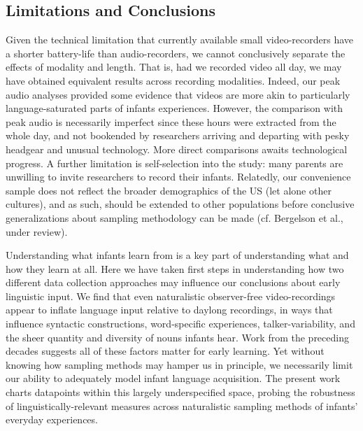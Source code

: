 \documentclass[man]{apa6}
\theoremstyle{definition}
\theoremstyle{definition}
\theoremstyle{definition}
\theoremstyle{remark}
\begin{document}
\subsection{Limitations and
Conclusions}\label{limitations-and-conclusions}

Given the technical limitation that currently available small
video-recorders have a shorter battery-life than audio-recorders, we
cannot conclusively separate the effects of modality and length. That
is, had we recorded video all day, we may have obtained equivalent
results across recording modalities. Indeed, our peak audio analyses
provided some evidence that videos are more akin to particularly
language-saturated parts of infants experiences. However, the comparison
with peak audio is necessarily imperfect since these hours were
extracted from the whole day, and not bookended by researchers arriving
and departing with pesky headgear and unusual technology. More direct
comparisons awaits technological progress. A further limitation is
self-selection into the study: many parents are unwilling to invite
researchers to record their infants. Relatedly, our convenience sample
does not reflect the broader demographics of the US (let alone other
cultures), and as such, should be extended to other populations before
conclusive generalizations about sampling methodology can be made (cf.
Bergelson et al., under review).

Understanding what infants learn from is a key part of understanding
what and how they learn at all. Here we have taken first steps in
understanding how two different data collection approaches may influence
our conclusions about early linguistic input. We find that even
naturalistic observer-free video-recordings appear to inflate language
input relative to daylong recordings, in ways that influence syntactic
constructions, word-specific experiences, talker-variability, and the
sheer quantity and diversity of nouns infants hear. Work from the
preceding decades suggests all of these factors matter for early
learning. Yet without knowing how sampling methods may hamper us in
principle, we necessarily limit our ability to adequately model infant
language acquisition. The present work charts datapoints within this
largely underspecified space, probing the robustness of
linguistically-relevant measures across naturalistic sampling methods of
infants' everyday experiences.\newpage
\end{document}
